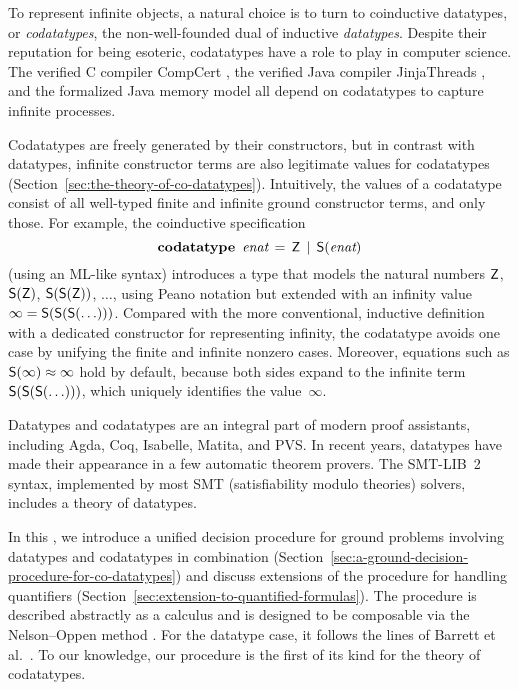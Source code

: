 To represent infinite objects, %
a natural choice is to turn to coinductive datatypes, or \emph{codatatypes},
the non-well-founded dual of inductive \emph{datatypes}.
%
Despite their reputation for being esoteric, codatatypes have a
role to play in computer science. The verified C compiler CompCert
\cite{leroy-2009}, the verified Java compiler Jinja\-Threads
\cite{lochbihler-2010-jinja}, and the formalized Java memory model
\cite{lochbihler-2014-jmm} all depend on codatatypes to capture infinite
processes.

Codatatypes are freely generated by their constructors, but in contrast with datatypes,
infinit\-e constructor terms are also legitimate values for codatatypes
(Section~\ref{sec:the-theory-of-co-datatypes}). Intuitively, the
values of a codatatype consist of all well-typed finite and infinite ground
constructor
terms, and only those. For example, the coinductive specification
%
\[\textbf{codatatype}~\,\textit{enat} \,=\, \textsf{Z} \,\mid\, \textsf{S}(\textit{enat})\]
%
(using an ML-like syntax) introduces a type that
models the natural numbers $\textsf{Z}$, $\textsf{S}(\textsf{Z})$, $\textsf{S}(\textsf{S}(\textsf{Z}))$, $\ldots$\afterLdots{},
using Peano notation but extended with an
infinity value $\infty = \textsf{S}(\textsf{S}(\textsf{S}(\ldots)))$. Compared
with the more conventional, inductive definition with a dedicated constructor
for representing infinity,
%
the codatatype avoids one case by unifying the finite and infinite nonzero cases.
Moreover, equations such as $\textsf{S}(\infty) \approx \infty$ hold by default,
because both sides expand to the infinite term
$\textsf{S}(\textsf{S}(\textsf{S}(\ldots)))$, which uniquely identifies the
value~$\infty$.

\nopagebreak

Datatypes and codatatypes are an integral part of modern proof assistants,
including Agda, Coq, Isabelle, Matita, and PVS. In recent years, datatypes
have made their appearance in a few automatic theorem provers. The SMT-LIB~2
\cite{barrett-et-al-2010} syntax, implemented by most SMT (satisfiability
modulo theories) solvers, includes a theory of datatypes.

\pagebreak

In this \thewordpaper, we introduce a unified decision procedure for ground
problems involving datatypes and codatatypes in combination
(Section~\ref{sec:a-ground-decision-procedure-for-co-datatypes})
and discuss extensions  of the procedure for handling quantifiers
(Section~\ref{sec:extension-to-quantified-formulas}).
The procedure is described abstractly as a calculus and is
designed to be composable via the Nelson--Oppen method \cite{nelson-oppen-1979}.
For the datatype case, it follows the lines of Barrett et al.\ \cite{barrett-et-al-2007}.
To our knowledge, our procedure is the first of its kind for the theory of
codatatypes.

